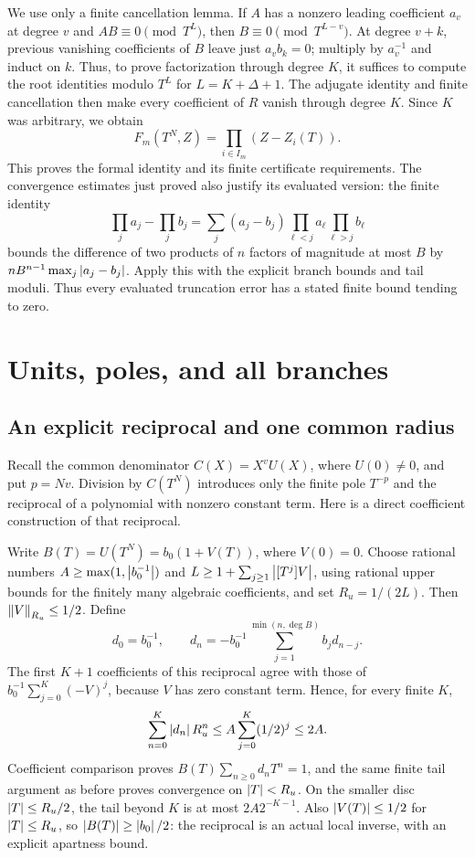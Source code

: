 We use only a finite cancellation lemma. If $A$ has a nonzero leading
coefficient $a_v$ at degree $v$ and $AB\equiv0\pmod{T^L}$, then
$B\equiv0\pmod{T^{L-v}}$. At degree $v+k$, previous vanishing
coefficients of $B$ leave just $a_vb_k=0$; multiply by $a_v^{-1}$
and induct on $k$. Thus, to prove factorization through degree $K$, it
suffices to compute the root identities modulo $T^L$ for
$L=K+\Delta+1$. The adjugate identity and finite cancellation then
make every coefficient of $R$ vanish through degree $K$. Since $K$
was arbitrary, we obtain
\begin{equation}
 F_m(T^N,Z)=\prod_{i\in I_m}(Z-Z_i(T)).
 \label{eq:exact-factor}
\end{equation}
This proves the formal identity and its finite certificate requirements.
The convergence estimates just proved also justify its evaluated version:
the finite identity
\[
 \prod_j a_j-\prod_j b_j
 =\sum_j(a_j-b_j)\prod_{\ell<j}a_\ell\prod_{\ell>j}b_\ell
\]
bounds the difference of two products of $n$ factors of magnitude at most
$B$ by $nB^{n-1}\max_j\left|a_j-b_j\right|$. Apply this with the explicit
branch bounds and tail moduli. Thus every evaluated truncation error has
a stated finite bound tending to zero.

\section{Units, poles, and all branches}
\label{sec:laurent}

\subsection{An explicit reciprocal and one common radius}

Recall the common denominator $C(X)=X^vU(X)$, where $U(0)\ne0$,
and put $p=Nv$. Division by $C(T^N)$ introduces only the finite pole
$T^{-p}$ and the reciprocal of a polynomial with nonzero constant term.
Here is a direct coefficient construction of that reciprocal.

Write $B(T)=U(T^N)=b_0(1+V(T))$, where $V(0)=0$.
Choose rational numbers $A\ge\max(1,\left|b_0^{-1}\right|)$ and
$L\ge1+\sum_{j\ge1}\left|[T^j]V\right|$, using rational upper bounds
for the finitely many algebraic coefficients, and set $R_u=1/(2L)$.
Then $\left\lVert V\right\rVert_{R_u}\le1/2$. Define
\[
 d_0=b_0^{-1},\qquad
 d_n=-b_0^{-1}\sum_{j=1}^{\min(n,\deg B)}b_jd_{n-j}.
\]
The first $K+1$ coefficients of this reciprocal agree with those of
$b_0^{-1}\sum_{j=0}^{K}(-V)^j$, because $V$ has zero constant term.
Hence, for every finite $K$,
\[
 \sum_{n=0}^{K}\left|d_n\right|R_u^n
 \le A\sum_{j=0}^{K}(1/2)^j\le2A.
\]
Coefficient comparison proves
$B(T)\sum_{n\ge0}d_nT^n=1$, and the same finite tail argument as
before proves convergence on $\left|T\right|<R_u$. On the smaller disc
$\left|T\right|\le R_u/2$, the tail beyond $K$ is at most $2A2^{-K-1}$.
Also $\left|V(T)\right|\le1/2$ for $\left|T\right|\le R_u$, so
$\left|B(T)\right|\ge\left|b_0\right|/2$: the reciprocal is an actual local
inverse, with an explicit apartness bound.

